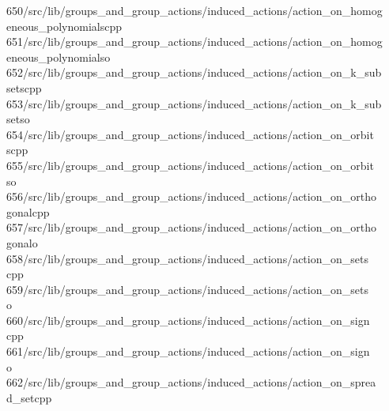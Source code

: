 \begin{tabbing}
650\>/src/lib/groups\_and\_group\_actions/induced\_actions/action\_on\_homog\\[0pt]
\>eneous\_polynomialscpp\\[0pt]
651\>/src/lib/groups\_and\_group\_actions/induced\_actions/action\_on\_homog\\[0pt]
\>eneous\_polynomialso\\[0pt]
652\>/src/lib/groups\_and\_group\_actions/induced\_actions/action\_on\_k\_sub\\[0pt]
\>setscpp\\[0pt]
653\>/src/lib/groups\_and\_group\_actions/induced\_actions/action\_on\_k\_sub\\[0pt]
\>setso\\[0pt]
654\>/src/lib/groups\_and\_group\_actions/induced\_actions/action\_on\_orbit\\[0pt]
\>scpp\\[0pt]
655\>/src/lib/groups\_and\_group\_actions/induced\_actions/action\_on\_orbit\\[0pt]
\>so\\[0pt]
656\>/src/lib/groups\_and\_group\_actions/induced\_actions/action\_on\_ortho\\[0pt]
\>gonalcpp\\[0pt]
657\>/src/lib/groups\_and\_group\_actions/induced\_actions/action\_on\_ortho\\[0pt]
\>gonalo\\[0pt]
658\>/src/lib/groups\_and\_group\_actions/induced\_actions/action\_on\_sets\\[0pt]
\>cpp\\[0pt]
659\>/src/lib/groups\_and\_group\_actions/induced\_actions/action\_on\_sets\\[0pt]
\>o\\[0pt]
660\>/src/lib/groups\_and\_group\_actions/induced\_actions/action\_on\_sign\\[0pt]
\>cpp\\[0pt]
661\>/src/lib/groups\_and\_group\_actions/induced\_actions/action\_on\_sign\\[0pt]
\>o\\[0pt]
662\>/src/lib/groups\_and\_group\_actions/induced\_actions/action\_on\_sprea\\[0pt]
\>d\_setcpp\\[0pt]

\end{tabbing}
